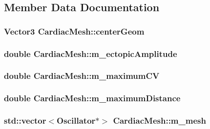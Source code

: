 \subsection{Member Data Documentation}
\hypertarget{class_cardiac_mesh_a671a783c6a63a79cc29e0b0baf8eda08}{
\subsubsection[{center\+Geom}]{\setlength{\rightskip}{0pt plus 5cm}Vector3 Cardiac\+Mesh\+::center\+Geom}}\label{class_cardiac_mesh_a671a783c6a63a79cc29e0b0baf8eda08}
\hypertarget{class_cardiac_mesh_a4eeec3a9a09b9bc7e68ca3f7b34ea36c}{
\subsubsection[{m\+\_\+ectopic\+Amplitude}]{\setlength{\rightskip}{0pt plus 5cm}double Cardiac\+Mesh\+::m\+\_\+ectopic\+Amplitude}}\label{class_cardiac_mesh_a4eeec3a9a09b9bc7e68ca3f7b34ea36c}
\hypertarget{class_cardiac_mesh_a48ee051becaeae6be8d4d1b1569645d2}{
\subsubsection[{m\+\_\+maximum\+C\+V}]{\setlength{\rightskip}{0pt plus 5cm}double Cardiac\+Mesh\+::m\+\_\+maximum\+C\+V}}\label{class_cardiac_mesh_a48ee051becaeae6be8d4d1b1569645d2}
\hypertarget{class_cardiac_mesh_a05ed4402cf331198ee5021c65ac37e23}{
\subsubsection[{m\+\_\+maximum\+Distance}]{\setlength{\rightskip}{0pt plus 5cm}double Cardiac\+Mesh\+::m\+\_\+maximum\+Distance}}\label{class_cardiac_mesh_a05ed4402cf331198ee5021c65ac37e23}
\hypertarget{class_cardiac_mesh_acd49de8f8f878f45c927d4b75851ced6}{
\subsubsection[{m\+\_\+mesh}]{\setlength{\rightskip}{0pt plus 5cm}std\+::vector$<${\bf Oscillator}$\ast$$>$ Cardiac\+Mesh\+::m\+\_\+mesh}}\label{class_cardiac_mesh_acd49de8f8f878f45c927d4b75851ced6}
